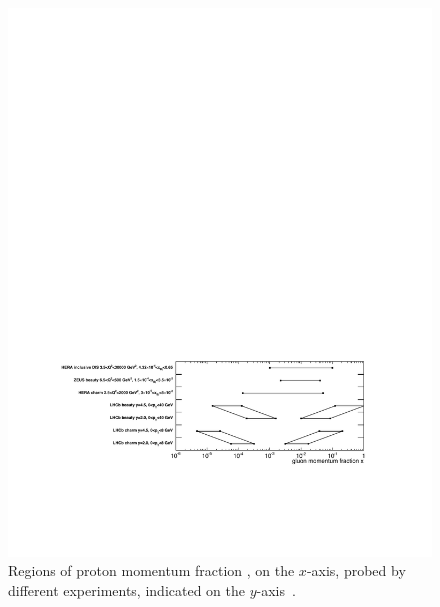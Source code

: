%   

\begin{figure}
  \centering
  \includegraphics[width=\textwidth]{figures/production/prosa_x_regions}
  \caption{%
    Regions of proton momentum fraction \bjorkenx, on the $x$-axis, probed by 
    different experiments, indicated on the $y$-axis~\cite{Zenaiev:2015rfa}.
  }
  \label{fig:prod:theory:prosa_x_regions}
\end{figure}

